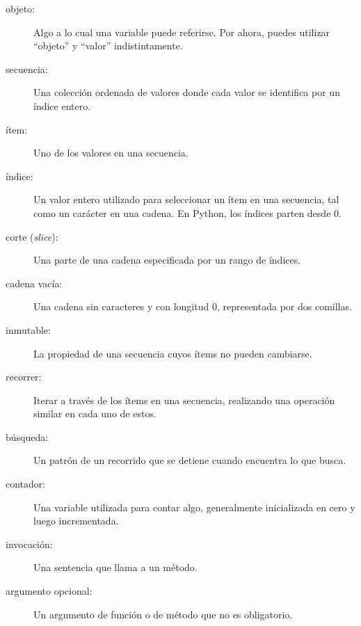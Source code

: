 \documentclass[10pt]{book}
\begin{document}
\begin{description}

\item[objeto:] Algo a lo cual una variable puede referirse.  Por ahora,
puedes utilizar ``objeto'' y ``valor'' indistintamente.

\item[secuencia:] Una colección ordenada de
valores donde cada valor se identifica por un índice entero.

\item[ítem:] Uno de los valores en una secuencia.

\item[índice:] Un valor entero utilizado para seleccionar un ítem en
una secuencia, tal como un carácter en una cadena.  En Python,
los índices parten desde 0.

\item[corte ({\em slice}):] Una parte de una cadena especificada por un rango de índices.

\item[cadena vacía:] Una cadena sin caracteres y con longitud 0, representada
por dos comillas.

\item[inmutable:] La propiedad de una secuencia cuyos ítems no pueden
cambiarse.

\item[recorrer:] Iterar a través de los ítems en una secuencia,
realizando una operación similar en cada uno de estos.

\item[búsqueda:] Un patrón de un recorrido que se detiene
cuando encuentra lo que busca.

\item[contador:] Una variable utilizada para contar algo, generalmente inicializada
en cero y luego incrementada.

\item[invocación:] Una sentencia que llama a un método.

\item[argumento opcional:] Un argumento de función o de método que no es
obligatorio.

\end{description}
\end{document}
